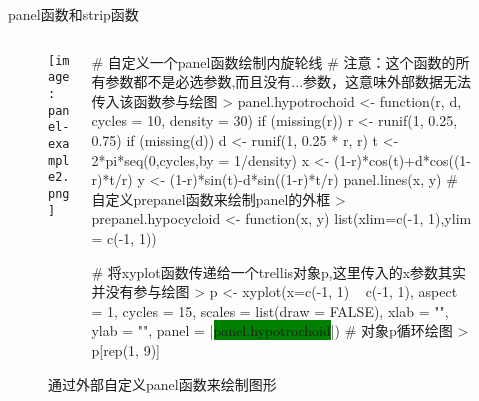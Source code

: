 \begin{frame}[c,fragile]{\subsecname}{panel函数和strip函数}
\begin{figure}
 \begin{columns}
    \begin{column}[c]{.45\textwidth}
        \texttt{[image: panel-example2.png]}
    \end{column}

    \begin{column}[c]{.55\textwidth}
\begin{rcode}
# 自定义一个panel函数绘制内旋轮线
# 注意：这个函数的所有参数都不是必选参数,而且没有...参数，这意味外部数据无法传入该函数参与绘图
> panel.hypotrochoid <- function(r, d, cycles = 10, density = 30)
 {
     if (missing(r)) r <- runif(1, 0.25, 0.75)
     if (missing(d)) d <- runif(1, 0.25 * r, r)
     t <- 2*pi*seq(0,cycles,by = 1/density)
     x <- (1-r)*cos(t)+d*cos((1-r)*t/r)
     y <- (1-r)*sin(t)-d*sin((1-r)*t/r)
     panel.lines(x, y)
 }
# 自定义prepanel函数来绘制panel的外框
> prepanel.hypocycloid <- function(x, y) {
     list(xlim=c(-1, 1),ylim = c(-1, 1))
 }

# 将xyplot函数传递给一个trellis对象p,这里传入的x参数其实并没有参与绘图
> p <- xyplot(x=c(-1, 1) ~ c(-1, 1), aspect = 1, cycles = 15, scales = list(draw = FALSE), xlab = "", ylab = "", panel = |\colorbox{green}{panel.hypotrochoid}|)
# 对象p循环绘图
> p[rep(1, 9)]
\end{rcode}
    \end{column}
  \end{columns}
  \caption{通过外部自定义panel函数来绘制图形}
\end{figure}
\end{frame} 

